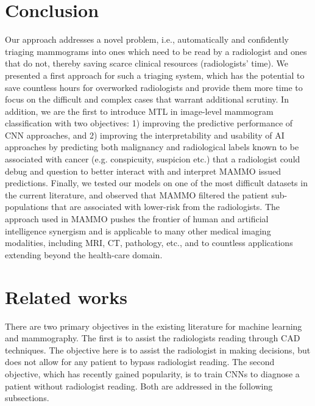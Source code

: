 \documentclass[journal]{IEEEtran}
\begin{document}
\section{Conclusion}

Our approach addresses a novel problem, i.e., automatically and confidently triaging mammograms into ones which need to be read by a radiologist and ones that do not, thereby saving scarce clinical resources (radiologists’ time). We presented a first approach for such a triaging system, which has the potential to save countless hours for overworked radiologists and provide them more time to focus on the difficult and complex cases that warrant additional scrutiny. In addition, we are the first to introduce MTL in image-level mammogram classification with two objectives: 1) improving the predictive performance of CNN approaches, and 2) improving the interpretability and usability of AI approaches by predicting both malignancy and radiological labels known to be associated with cancer (e.g. conspicuity, suspicion etc.) that a radiologist could debug and question to better interact with and interpret MAMMO issued predictions.  Finally, we tested our models on one of the most difficult datasets in the current literature, and observed that MAMMO filtered the patient sub-populations that are associated with lower-risk from the radiologists.   
The approach used in MAMMO pushes the frontier of human and artificial intelligence synergism and is applicable to many other medical imaging modalities, including MRI, CT, pathology, etc., and to countless applications extending beyond the health-care domain.
















\appendices


\section{\label{Appendix:related}Related works}

There are two primary objectives in the existing literature for machine learning and mammography.  The first is to assist the radiologists reading through CAD techniques.  The objective here is to assist the radiologist in making decisions, but does not allow for any patient to bypass radiologist reading.  The second objective, which has recently gained popularity, is to train CNNs to diagnose a patient without radiologist reading.  Both are addressed in the following subsections.  
\end{document}
